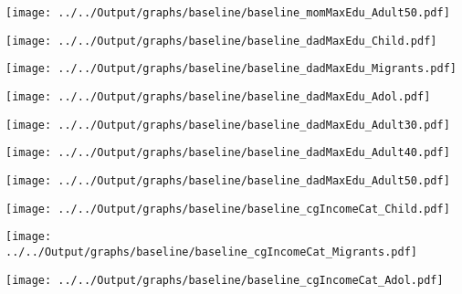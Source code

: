 \documentclass{beamer}
\begin{document}
\begin{frame}
\texttt{[image: ../../Output/graphs/baseline/baseline\_momMaxEdu\_Adult50.pdf]}
\end{frame}

\begin{frame}
\texttt{[image: ../../Output/graphs/baseline/baseline\_dadMaxEdu\_Child.pdf]}
\end{frame}

\begin{frame}
\texttt{[image: ../../Output/graphs/baseline/baseline\_dadMaxEdu\_Migrants.pdf]}
\end{frame}

\begin{frame}
\texttt{[image: ../../Output/graphs/baseline/baseline\_dadMaxEdu\_Adol.pdf]}
\end{frame}

\begin{frame}
\texttt{[image: ../../Output/graphs/baseline/baseline\_dadMaxEdu\_Adult30.pdf]}
\end{frame}

\begin{frame}
\texttt{[image: ../../Output/graphs/baseline/baseline\_dadMaxEdu\_Adult40.pdf]}
\end{frame}

\begin{frame}
\texttt{[image: ../../Output/graphs/baseline/baseline\_dadMaxEdu\_Adult50.pdf]}
\end{frame}

\begin{frame}
\texttt{[image: ../../Output/graphs/baseline/baseline\_cgIncomeCat\_Child.pdf]}
\end{frame}

\begin{frame}
\texttt{[image: ../../Output/graphs/baseline/baseline\_cgIncomeCat\_Migrants.pdf]}
\end{frame}

\begin{frame}
\texttt{[image: ../../Output/graphs/baseline/baseline\_cgIncomeCat\_Adol.pdf]}
\end{frame}
\end{document}
